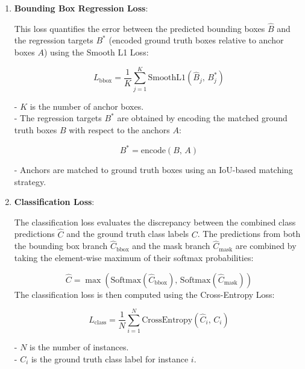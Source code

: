\begin{enumerate}
    \item \textbf{Bounding Box Regression Loss}:

    This loss quantifies the error between the predicted bounding boxes \( \hat{B} \) and the regression targets \( B^* \) (encoded ground truth boxes relative to anchor boxes \( A \)) using the Smooth L1 Loss:
    
    \begin{equation}
        L_{\text{bbox}} = \frac{1}{K} \sum_{j=1}^{K} \text{SmoothL1}\left( \hat{B}_j, \, B^*_j \right) \tag{12}
    \end{equation}
    
    - \( K \) is the number of anchor boxes. \\ 
    - The regression targets \( B^* \) are obtained by encoding the matched ground truth boxes \( B \) with respect to the anchors \( A \):
    
      \begin{equation}
        B^* = \text{encode}\left( B, \, A \right) \tag{13}
      \end{equation}
    
    - Anchors are matched to ground truth boxes using an IoU-based matching strategy.

    \newpage
    \item \textbf{Classification Loss}:

    The classification loss evaluates the discrepancy between the combined class predictions \( \hat{C} \) and the ground truth class labels \( C \). 
    The predictions from both the bounding box branch \( \hat{C}_{\text{bbox}} \) and the mask branch \( \hat{C}_{\text{mask}} \) are combined by 
    taking the element-wise maximum of their softmax probabilities:
    
    \begin{equation}
        \hat{C} = \max\left( \text{Softmax}\left( \hat{C}_{\text{bbox}} \right), \, \text{Softmax}\left( \hat{C}_{\text{mask}} \right) \right) \tag{14}
    \end{equation}    
    The classification loss is then computed using the Cross-Entropy Loss:
    
    \begin{equation}
        L_{\text{class}} = \frac{1}{N} \sum_{i=1}^{N} \text{CrossEntropy}\left( \hat{C}_i, \, C_i \right) \tag{15}
    \end{equation}
    
    - \( N \) is the number of instances. \\
    - \( C_i \) is the ground truth class label for instance \( i \).

\end{enumerate}


